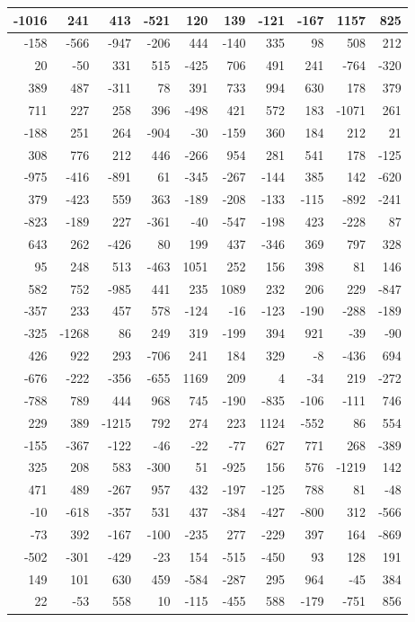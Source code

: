 \documentclass[
]{book}
\begin{document}
\begin{tabular}{r|r|r|r|r|r|r|r|r|r}
\hline
-1016 & 241 & 413 & -521 & 120 & 139 & -121 & -167 & 1157 & 825\\
\hline
-158 & -566 & -947 & -206 & 444 & -140 & 335 & 98 & 508 & 212\\
\hline
20 & -50 & 331 & 515 & -425 & 706 & 491 & 241 & -764 & -320\\
\hline
389 & 487 & -311 & 78 & 391 & 733 & 994 & 630 & 178 & 379\\
\hline
711 & 227 & 258 & 396 & -498 & 421 & 572 & 183 & -1071 & 261\\
\hline
-188 & 251 & 264 & -904 & -30 & -159 & 360 & 184 & 212 & 21\\
\hline
308 & 776 & 212 & 446 & -266 & 954 & 281 & 541 & 178 & -125\\
\hline
-975 & -416 & -891 & 61 & -345 & -267 & -144 & 385 & 142 & -620\\
\hline
379 & -423 & 559 & 363 & -189 & -208 & -133 & -115 & -892 & -241\\
\hline
-823 & -189 & 227 & -361 & -40 & -547 & -198 & 423 & -228 & 87\\
\hline
643 & 262 & -426 & 80 & 199 & 437 & -346 & 369 & 797 & 328\\
\hline
95 & 248 & 513 & -463 & 1051 & 252 & 156 & 398 & 81 & 146\\
\hline
582 & 752 & -985 & 441 & 235 & 1089 & 232 & 206 & 229 & -847\\
\hline
-357 & 233 & 457 & 578 & -124 & -16 & -123 & -190 & -288 & -189\\
\hline
-325 & -1268 & 86 & 249 & 319 & -199 & 394 & 921 & -39 & -90\\
\hline
426 & 922 & 293 & -706 & 241 & 184 & 329 & -8 & -436 & 694\\
\hline
-676 & -222 & -356 & -655 & 1169 & 209 & 4 & -34 & 219 & -272\\
\hline
-788 & 789 & 444 & 968 & 745 & -190 & -835 & -106 & -111 & 746\\
\hline
229 & 389 & -1215 & 792 & 274 & 223 & 1124 & -552 & 86 & 554\\
\hline
-155 & -367 & -122 & -46 & -22 & -77 & 627 & 771 & 268 & -389\\
\hline
325 & 208 & 583 & -300 & 51 & -925 & 156 & 576 & -1219 & 142\\
\hline
471 & 489 & -267 & 957 & 432 & -197 & -125 & 788 & 81 & -48\\
\hline
-10 & -618 & -357 & 531 & 437 & -384 & -427 & -800 & 312 & -566\\
\hline
-73 & 392 & -167 & -100 & -235 & 277 & -229 & 397 & 164 & -869\\
\hline
-502 & -301 & -429 & -23 & 154 & -515 & -450 & 93 & 128 & 191\\
\hline
149 & 101 & 630 & 459 & -584 & -287 & 295 & 964 & -45 & 384\\
\hline
22 & -53 & 558 & 10 & -115 & -455 & 588 & -179 & -751 & 856\\
\hline
\end{tabular}
\end{document}
